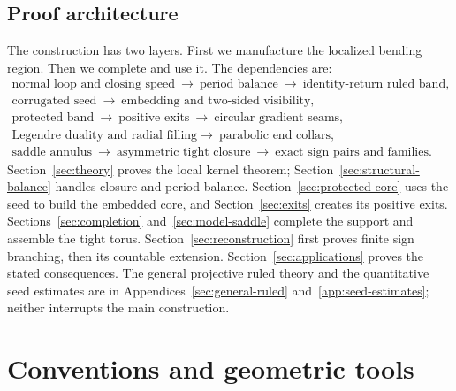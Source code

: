 \documentclass[11pt]{amsart}
\theoremstyle{definition}
\theoremstyle{remark}
\numberwithin{equation}{section}
\begin{document}
\subsection{Proof architecture}
The construction has two layers. First we manufacture the localized
bending region. Then we complete and use it. The dependencies are:
\[
 \begin{gathered}
 \text{normal loop and closing speed}
 \ \longrightarrow\ \text{period balance}
 \ \longrightarrow\ \text{identity-return ruled band},\\
 \text{corrugated seed}
 \ \longrightarrow\ \text{embedding and two-sided visibility},\\
 \text{protected band}
 \ \longrightarrow\ \text{positive exits}
 \ \longrightarrow\ \text{circular gradient seams},\\
 \text{Legendre duality and radial filling}
 \longrightarrow\ \text{parabolic end collars},\\
 \text{saddle annulus}
 \ \longrightarrow\ \text{asymmetric tight closure}
 \ \longrightarrow\ \text{exact sign pairs and families}.
 \end{gathered}
\]
Section~\ref{sec:theory} proves the local kernel theorem;
Section~\ref{sec:structural-balance} handles closure and period balance.
Section~\ref{sec:protected-core} uses the seed to build the embedded core,
and Section~\ref{sec:exits} creates its positive exits.
Sections~\ref{sec:completion} and~\ref{sec:model-saddle} complete the
support and assemble the tight torus. Section~\ref{sec:reconstruction}
first proves finite sign branching, then its countable extension.
Section~\ref{sec:applications} proves the stated consequences.
The general projective ruled theory and the quantitative seed estimates
are in Appendices~\ref{sec:general-ruled} and~\ref{app:seed-estimates};
neither interrupts the main construction.

\section{Conventions and geometric tools}\label{sec:prelim}
\end{document}
